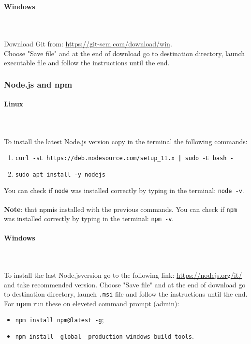 \paragraph{Windows} \mbox{} \\ \mbox{} \\
Download Git from: \url{https://git-scm.com/download/win}. \\
Choose "Save file" and at the end of download go to destination directory, launch executable file and follow the instructions until the end.

\subsubsection{Node.js and npm}
\paragraph{Linux} \mbox{} \\ \mbox{} \\
To install the latest Node.js version copy in the terminal the following commands:
\begin{enumerate}
	\item \texttt{curl -sL https://deb.nodesource.com/setup\_11.x | sudo -E bash -}
	\item \texttt{sudo apt install -y nodejs}
\end{enumerate} 
You can check if \texttt{node} was installed correctly by typing in the 
terminal: \texttt{node -v}.\\ \\
\textbf{Note}: that npm\glosp is installed with the previous commands. You can check if \texttt{npm} was installed correctly by typing in the 
terminal: \texttt{npm -v}.\\
\paragraph{Windows} \mbox{} \\ \mbox{} \\
To install the last Node.js\glosp version go to the following link: \url{https://nodejs.org/it/} and take recommended version.
Choose "Save file" and at the end of download go to destination directory, launch \texttt{.msi} file and follow the instructions until the end.
For \textbf{npm} run these on eleveted command prompt (admin):
\begin{itemize}
	\item \texttt{npm install npm@latest -g};
	\item \texttt{npm install ---global ---production windows-build-tools}.
\end{itemize}

